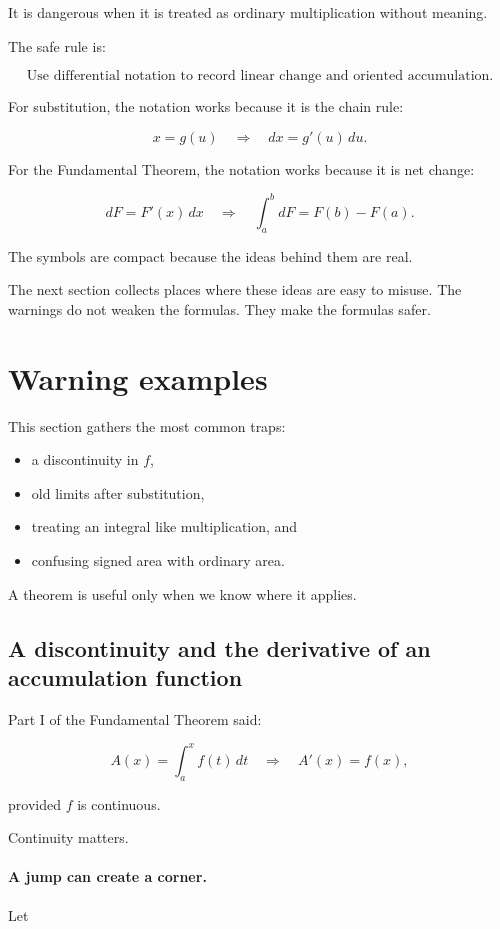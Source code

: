 It is dangerous when it is treated as ordinary multiplication without meaning.

The safe rule is:

\[
\boxed{
\text{Use differential notation to record linear change and oriented accumulation.}
}
\]

For substitution, the notation works because it is the chain rule:

\[
x=g(u)
\quad\Longrightarrow\quad
dx=g'(u)\,du.
\]

For the Fundamental Theorem, the notation works because it is net change:

\[
dF=F'(x)\,dx
\quad\Longrightarrow\quad
\int_a^b dF=F(b)-F(a).
\]

The symbols are compact because the ideas behind them are real.

The next section collects places where these ideas are easy to misuse.  The warnings do
not weaken the formulas.  They make the formulas safer.

\section{Warning examples}
\label{sec:warning-examples-ftc}


This section gathers the most common traps:
\begin{itemize}
    \item a discontinuity in \(f\),
    \item old limits after substitution,
    \item treating an integral like multiplication, and
    \item confusing signed area with ordinary area.
\end{itemize}

A theorem is useful only when we know where it applies.

\subsection{A discontinuity and the derivative of an accumulation function}
\label{subsec:warning-discontinuity-accumulation}

Part I of the Fundamental Theorem said:

\[
A(x)=\int_a^x f(t)\,dt
\quad\Longrightarrow\quad
A'(x)=f(x),
\]

provided \(f\) is continuous.

Continuity matters.

\paragraph{A jump can create a corner.}
Let

